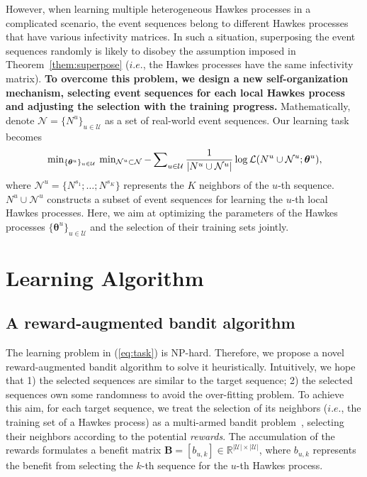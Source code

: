 \documentclass[runningheads]{llncs}
\begin{document}
However, when learning multiple heterogeneous Hawkes processes in a complicated scenario, the event sequences belong to different Hawkes processes that have various infectivity matrices. 
In such a situation, superposing the event sequences randomly is likely to disobey the assumption imposed in Theorem~\ref{them:superpose} ($i.e.$, the Hawkes processes have the same infectivity matrix). 
\textbf{To overcome this problem, we design a new self-organization mechanism, selecting event sequences for each local Hawkes process and adjusting the selection with the training progress.}
Mathematically, denote $\mathcal{N} = \{N^u\}_{u \in \mathcal{U}}$ as a set of real-world event sequences. 
Our learning task becomes
\begin{eqnarray}\label{eq:task}
\begin{aligned}
\sideset{}{_{\{\bm{\theta}^u\}_{u\in\mathcal{U}}}}\min  \sideset{}{_{\mathcal{N}^u \subset \mathcal{N}}}\min
-\sideset{}{_{u \in \mathcal{U}}}\sum\frac{1}{|N^u \cup \mathcal{N}^u|}\log \mathcal{L}(N^u \cup \mathcal{N}^u; \bm{\theta}^u),
\end{aligned}    
\end{eqnarray}
where $\mathcal{N}^u=\{N^{s_1};\ldots;N^{s_K}\}$ represents the $K$ neighbors of the $u$-th sequence. 
$N^u \cup \mathcal{N}^u$ constructs a subset of event sequences for learning the $u$-th local Hawkes processes.
Here, we aim at optimizing the parameters of the Hawkes processes $\{\bm{\theta}^u\}_{u\in\mathcal{U}}$ and the selection of their training sets jointly.

\section{Learning Algorithm}
\subsection{A reward-augmented bandit algorithm}
The learning problem in (\ref{eq:task}) is NP-hard. 
Therefore, we propose a novel reward-augmented bandit algorithm to solve it heuristically. 
Intuitively, we hope that 1) the selected sequences are similar to the target sequence; 2) the selected sequences own some randomness to avoid the over-fitting problem. 
To achieve this aim, for each target sequence, we treat the selection of its neighbors ($i.e.$, the training set of a Hawkes process) as a multi-armed bandit problem~\cite{auer2002nonstochastic}, selecting their neighbors according to the potential \textit{rewards}. 
The accumulation of the rewards formulates a benefit matrix $\bm{B}=[b_{u,k}]\in\mathbb{R}^{|\mathcal{U}|\times |\mathcal{U}|}$, where $b_{u,k}$ represents the benefit from selecting the $k$-th sequence for the $u$-th Hawkes process. 
\end{document}
